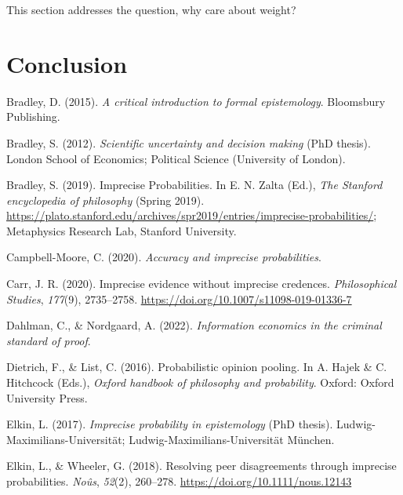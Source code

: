 \documentclass[
  10pt,
  dvipsnames,enabledeprecatedfontcommands]{scrartcl}
\newlength{\cslhangindent}
\newlength{\cslentryspacingunit} %
\newenvironment{CSLReferences}[2] %
 {%
  \setlength{\parindent}{0pt}
  \ifodd #1
  \let\oldpar\par
  \def\par{\hangindent=\cslhangindent\oldpar}
  \fi
  \setlength{\parskip}{#2\cslentryspacingunit}
 }%
 {}
\begin{document}
This section addresses the question, why care about weight?

\hypertarget{conclusion}{%
\section*{Conclusion}\label{conclusion}}

\hypertarget{refs}{}
\begin{CSLReferences}{1}{0}
\leavevmode{}%
Bradley, D. (2015). \emph{A critical introduction to formal
epistemology}. Bloomsbury Publishing.

\leavevmode{}%
Bradley, S. (2012). \emph{Scientific uncertainty and decision making}
(PhD thesis). London School of Economics; Political Science (University
of London).

\leavevmode{}%
Bradley, S. (2019). {Imprecise Probabilities}. In E. N. Zalta (Ed.),
\emph{The {Stanford} encyclopedia of philosophy} ({S}pring 2019).
\url{https://plato.stanford.edu/archives/spr2019/entries/imprecise-probabilities/};
Metaphysics Research Lab, Stanford University.

\leavevmode{}%
Campbell-Moore, C. (2020). \emph{Accuracy and imprecise probabilities}.

\leavevmode{}%
Carr, J. R. (2020). Imprecise evidence without imprecise credences.
\emph{Philosophical Studies}, \emph{177}(9), 2735--2758.
\url{https://doi.org/10.1007/s11098-019-01336-7}

\leavevmode{}%
Dahlman, C., \& Nordgaard, A. (2022). \emph{Information economics in the
criminal standard of proof}.

\leavevmode{}%
Dietrich, F., \& List, C. (2016). Probabilistic opinion pooling. In A.
Hajek \& C. Hitchcock (Eds.), \emph{Oxford handbook of philosophy and
probability}. Oxford: Oxford University Press.

\leavevmode{}%
Elkin, L. (2017). \emph{Imprecise probability in epistemology} (PhD
thesis). Ludwig-Maximilians-Universit{ä}t;
Ludwig-Maximilians-Universität München.

\leavevmode{}%
Elkin, L., \& Wheeler, G. (2018). Resolving peer disagreements through
imprecise probabilities. \emph{Noûs}, \emph{52}(2), 260--278.
\url{https://doi.org/10.1111/nous.12143}


\end{CSLReferences}
\end{document}

